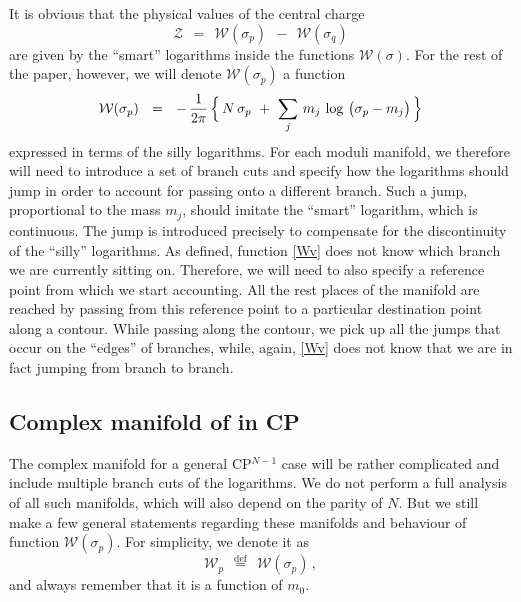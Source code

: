 \documentclass[epsfig,12pt]{article}
\def\beq{\begin{equation}}
\def\eeq{\end{equation}}
\def\beq{\begin{equation}}
\def\eeq{\end{equation}}
\newcommand{\mc}[1]{\mathcal{#1}}
\newcommand{\W}{\mathcal{W}}
\begin{document}
	It is obvious that the physical values of the central charge 
\beq
\label{ccharge}
	\mc{Z} ~~=~~ \W(\sigma_p) ~~-~~ \W(\sigma_q)
\eeq
	are given by the ``smart'' logarithms inside the functions $ \W(\sigma) $.
	For the rest of the paper, however, we will denote $ \W(\sigma_p) $ a function 
\beq
\label{Wv}
	\W ( \sigma_p ) ~~=~~ 
		-\, \frac{1}{2\pi}\,  
                \Bigl\{\, N\, \sigma_p ~+~ \sum_j\, m_j\, \log\, \big( \sigma_p - m_j \big) \,\Bigr\}
\eeq
	expressed in terms of the silly logarithms. 
	For each moduli manifold, we therefore will need to introduce a set of branch cuts and 
	specify how the logarithms should jump in order to account for passing onto a different branch.
	Such a jump, proportional to the mass $ m_j $, should imitate the ``smart'' logarithm,
	which is continuous.
	The jump is introduced precisely to compensate for the discontinuity of the ``silly'' logarithms.
	As defined, function \eqref{Wv} does not know which branch we are currently sitting on.
	Therefore, we will need to also specify a reference point from which we start accounting.
	All the rest places of the manifold are reached by passing from this reference point to a
	particular destination point along a contour.
	While passing along the contour, we pick up all the jumps that occur on the ``edges'' of 
	branches, while, again, \eqref{Wv} does not know that we are in fact jumping from
	branch to branch.


\subsection{Complex manifold of  in CP}

	The  complex manifold for a general CP$^{N-1}$ case will be rather complicated and include
	multiple branch cuts of the logarithms.
	We do not perform a full analysis of all such manifolds, which will also depend on 
	the parity of $ N $.
	But we still make a few general statements regarding these manifolds and behaviour of function $ \W(\sigma_p) $.
	For simplicity, we denote it as
\beq
	\W_p ~~\stackrel{\text{def}}{=} ~~ \W(\sigma_p)\,,
\eeq
	and always remember that it is a function of $ m_0 $.
\end{document}
